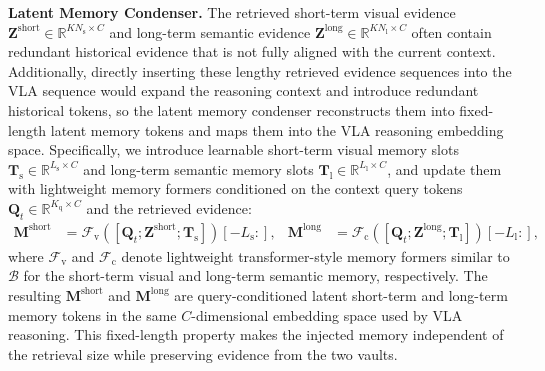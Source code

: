 \noindent\textbf{Latent Memory Condenser.}
The retrieved short-term visual evidence $\bm{Z}^\text{short}\in\mathbb{R}^{KN_\text{s}\times C}$ and long-term semantic evidence $\bm{Z}^\text{long}\in\mathbb{R}^{KN_\text{l}\times C}$ often contain redundant historical evidence that is not fully aligned with the current context.
Additionally, directly inserting these lengthy retrieved evidence sequences into the VLA sequence would expand the reasoning context and introduce redundant historical tokens, so the latent memory condenser reconstructs them into fixed-length latent memory tokens and maps them into the VLA reasoning embedding space.
Specifically, we introduce learnable short-term visual memory slots $\bm{T}_\text{s}\in\mathbb{R}^{L_\text{s}\times C}$ and long-term semantic memory slots $\bm{T}_\text{l}\in\mathbb{R}^{L_\text{l} \times C}$, and update them with lightweight memory formers conditioned on the context query tokens $\bm{Q}_t\in\mathbb{R}^{K_\text{q}\times C}$ and the retrieved evidence:
\begin{equation}
    \label{eq:memory_condensation}
    \begin{aligned}
        \bm{M}^\text{short} &= \mathcal{F}_\text{v}([\bm{Q}_t; \bm{Z}^\text{short}; \bm{T}_\text{s}])[-L_\text{s}:], &
        \bm{M}^\text{long} &= \mathcal{F}_\text{c}([\bm{Q}_t; \bm{Z}^\text{long}; \bm{T}_\text{l}])[-L_\text{l}:],
    \end{aligned}
\end{equation}
where $\mathcal{F}_\text{v}$ and $\mathcal{F}_\text{c}$ denote lightweight transformer-style memory formers similar to $\mathcal{B}$ for the short-term visual and long-term semantic memory, respectively.
The resulting $\bm{M}^\text{short}$ and $\bm{M}^\text{long}$ are query-conditioned latent short-term and long-term memory tokens in the same $C$-dimensional embedding space used by VLA reasoning.
This fixed-length property makes the injected memory independent of the retrieval size while preserving evidence from the two vaults.

